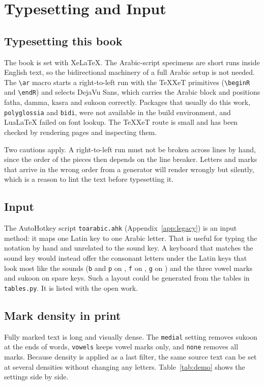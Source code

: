 \chapter{Typesetting and Input}\label{ch:typesetting}

\section{Typesetting this book}
The book is set with XeLaTeX. The Arabic-script specimens are short runs inside English text, so the bidirectional machinery of a full Arabic setup is not needed. The \texttt{\textbackslash ar} macro starts a right-to-left run with the TeXXeT primitives (\texttt{\textbackslash beginR} and \texttt{\textbackslash endR}) and selects DejaVu Sans, which carries the Arabic block and positions fatha, damma, kasra and sukoon correctly. Packages that usually do this work, \texttt{polyglossia} and \texttt{bidi}, were not available in the build environment, and LuaLaTeX failed on font lookup. The TeXXeT route is small and has been checked by rendering pages and inspecting them.

Two cautions apply. A right-to-left run must not be broken across lines by hand, since the order of the pieces then depends on the line breaker. Letters and marks that arrive in the wrong order from a generator will render wrongly but silently, which is a reason to lint the text before typesetting it.

\section{Input}
The AutoHotkey script \texttt{toarabic.ahk} (Appendix~\ref{app:legacy}) is an input method: it maps one Latin key to one Arabic letter. That is useful for typing the notation by hand and unrelated to the sound key. A keyboard that matches the sound key would instead offer the consonant letters under the Latin keys that look most like the sounds (\texttt{b} and \texttt{p} on , \texttt{f} on , \texttt{g} on ) and the three vowel marks and sukoon on spare keys. Such a layout could be generated from the tables in \texttt{tables.py}. It is listed with the open work.

\section{Mark density in print}
Fully marked text is long and visually dense. The \texttt{medial} setting removes sukoon at the ends of words, \texttt{vowels} keeps vowel marks only, and \texttt{none} removes all marks. Because density is applied as a last filter, the same source text can be set at several densities without changing any letters. Table~\ref{tab:demo} shows the settings side by side.

